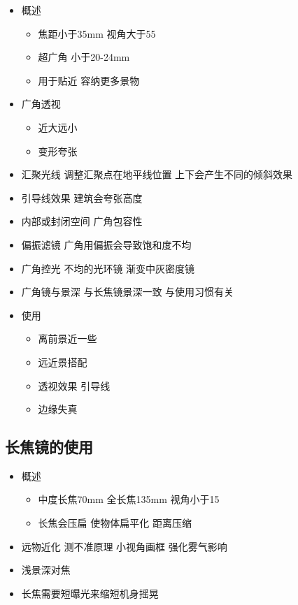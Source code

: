 \documentclass[
  letterpaper,
  DIV=11,
  numbers=noendperiod]{scrreprt}
\providecommand{\tightlist}{%
  \setlength{\itemsep}{0pt}\setlength{\parskip}{0pt}}\usepackage{longtable,booktabs,array}
\begin{document}
\begin{itemize}
\tightlist
\item
  概述

  \begin{itemize}
  \tightlist
  \item
    焦距小于35mm 视角大于55
  \item
    超广角 小于20-24mm
  \item
    用于贴近 容纳更多景物
  \end{itemize}
\item
  广角透视

  \begin{itemize}
  \tightlist
  \item
    近大远小
  \item
    变形夸张
  \end{itemize}
\item
  汇聚光线 调整汇聚点在地平线位置 上下会产生不同的倾斜效果
\item
  引导线效果 建筑会夸张高度
\item
  内部或封闭空间 广角包容性
\item
  偏振滤镜 广角用偏振会导致饱和度不均
\item
  广角控光 不均的光环镜 渐变中灰密度镜
\item
  广角镜与景深 与长焦镜景深一致 与使用习惯有关
\item
  使用

  \begin{itemize}
  \tightlist
  \item
    离前景近一些
  \item
    远近景搭配
  \item
    透视效果 引导线
  \item
    边缘失真
  \end{itemize}
\end{itemize}

\subsection{长焦镜的使用}\label{ux957fux7126ux955cux7684ux4f7fux7528}

\begin{itemize}
\tightlist
\item
  概述

  \begin{itemize}
  \tightlist
  \item
    中度长焦70mm 全长焦135mm 视角小于15
  \item
    长焦会压扁 使物体扁平化 距离压缩
  \end{itemize}
\item
  远物近化 测不准原理 小视角画框 强化雾气影响
\item
  浅景深对焦
\item
  长焦需要短曝光来缩短机身摇晃
\end{itemize}
\end{document}
